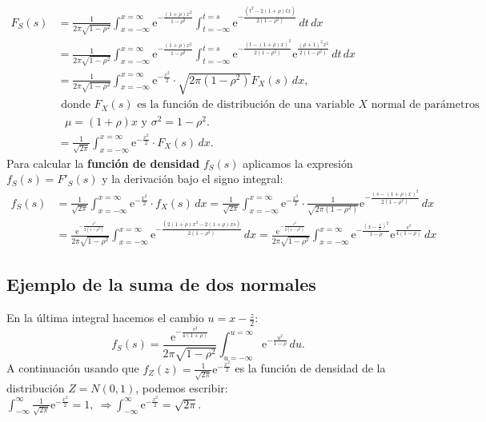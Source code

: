\documentclass[]{book}
\begin{document}
\[
\begin{array}{rl}
F_S(s) & =  \frac{1}{2\pi\sqrt{1-\rho^2}} \int_{x=-\infty}^{x=\infty} \mathrm{e}^{-\frac{(1+\rho)x^2}{1-\rho^2}}\int_{t=-\infty}^{t=s} \mathrm{e}^{-\frac{(t^2-2(1+\rho) t x)}{2(1-\rho^2)}}\, dt\, dx \\ & = \frac{1}{2\pi\sqrt{1-\rho^2}} \int_{x=-\infty}^{x=\infty} \mathrm{e}^{-\frac{(1+\rho)x^2}{1-\rho^2}}\int_{t=-\infty}^{t=s} \mathrm{e}^{-\frac{(t-(1+\rho)x)^2}{2(1-\rho^2)}} \mathrm{e}^{\frac{(\rho+1)^2 x^2}{2(1-\rho^2)}}\, dt\, dx  \\ & = \frac{1}{2\pi\sqrt{1-\rho^2}} \int_{x=-\infty}^{x=\infty} \mathrm{e}^{-\frac{x^2}{2}}\cdot \sqrt{2\pi (1-\rho^2)} F_X(s)\, dx, \\ & \mbox{ donde $F_X(s)$ es la función de distribución de una variable $X$ normal de parámetros} \\ & \mbox{ $\mu =(1+\rho)x$ y $\sigma^2=1-\rho^2$.} \\ & = \frac{1}{\sqrt{2\pi}}\int_{x=-\infty}^{x=\infty} \mathrm{e}^{-\frac{x^2}{2}}\cdot F_X(s)\, dx.
\end{array}
\]
Para calcular la \textbf{función de densidad} \(f_S(s)\) aplicamos la expresión \(f_S(s)=F'_S(s)\) y la derivación bajo el signo integral:
\[
\begin{array}{rl}
f_S(s) & = \frac{1}{\sqrt{2\pi}}\int_{x=-\infty}^{x=\infty} \mathrm{e}^{-\frac{x^2}{2}}\cdot f_X(s)\, dx = \frac{1}{\sqrt{2\pi}}\int_{x=-\infty}^{x=\infty} \mathrm{e}^{-\frac{x^2}{2}}\cdot \frac{1}{\sqrt{2\pi (1-\rho^2)}}\mathrm{e}^{-\frac{(s-(1+\rho)x)^2}{2(1-\rho^2)}}\, dx \\ & = \frac{\mathrm{e}^{-\frac{s^2}{2(1-\rho^2)}}}{2\pi\sqrt{1-\rho^2}} \int_{x=-\infty}^{x=\infty} \mathrm{e}^{-\frac{(2(1+\rho) x^2-2(1+\rho)xs)}{2(1-\rho^2)}}\, dx= \frac{\mathrm{e}^{-\frac{s^2}{2(1-\rho^2)}}}{2\pi\sqrt{1-\rho^2}} \int_{x=-\infty}^{x=\infty} \mathrm{e}^{-\frac{\left(x-\frac{s}{2}\right)^2}{1-\rho}}\mathrm{e}^{\frac{s^2}{4(1-\rho)}}\, dx
\end{array}
\]

\hypertarget{ejemplo-de-la-suma-de-dos-normales-2}{%
\subsection{Ejemplo de la suma de dos normales}\label{ejemplo-de-la-suma-de-dos-normales-2}}

En la última integral hacemos el cambio \(u=x-\frac{z}{2}\):
\[
f_S(s)  =\frac{\mathrm{e}^{-\frac{s^2}{4(1+\rho)}}}{2\pi\sqrt{1-\rho^2}} \int_{u=-\infty}^{u=\infty} \mathrm{e}^{-\frac{u^2}{1-\rho}}\, du.
\]
A continuación usando que \(f_Z(z)=\frac{1}{\sqrt{2\pi}}\mathrm{e}^{-\frac{x^2}{2}}\) es la función de densidad de la distribución \(Z=N(0,1)\), podemos escribir: \(\int_{-\infty}^\infty \frac{1}{\sqrt{2\pi}}\mathrm{e}^{-\frac{x^2}{2}}=1,\ \Rightarrow \int_{-\infty}^\infty \mathrm{e}^{-\frac{x^2}{2}}=\sqrt{2\pi}.\)
\end{document}
